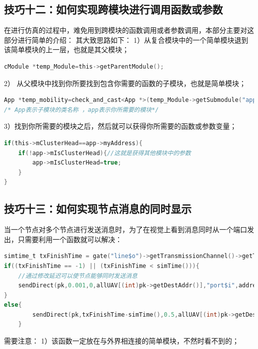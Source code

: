 \subsection{技巧十二：如何实现跨模块进行调用函数或参数}
\label{技巧十二：如何实现跨模块进行调用函数或参数}

在进行仿真的过程中，难免用到跨模块的函数调用或者参数调用，本部分主要对这部分进行简单的介绍：
其大致思路如下：
1）从复合模块中的一个简单模块退到该简单模块的上一层，也就是其父模块；

\begin{lstlisting}[language=c]
cModule *temp_Module=this->getParentModule();
\end{lstlisting}

2） 从父模块中找到你所要找到包含你需要的函数的子模块，也就是简单模块；

\begin{lstlisting}[language=c]
App *temp_mobility=check_and_cast<App *>(temp_Module->getSubmodule("app"));
/* App表示子模块的类名称 ，app表示你所需要的模块*/
\end{lstlisting}

3）找到你所需要的模块之后，然后就可以获得你所需要的函数或参数变量；

\begin{lstlisting}[language=c]
if(this->mClusterHead==app->myAddress){
    if(!app->mIsClusterHead){//这就是获得其他模块中的参数
        app->mIsClusterHead=true;
    }
}
\end{lstlisting}

\subsection{技巧十三：如何实现节点消息的同时显示}
\label{技巧十三：如何实现节点消息的同时显示}

当一个节点对多个节点进行发送消息时，为了在视觉上看到消息同时从一个端口发出，只需要利用一个函数就可以解决：

\begin{lstlisting}[language=c]
simtime_t txFinishTime = gate("line$o")->getTransmissionChannel()->getTransmissionFinishTime();
if((txFinishTime == -1) || (txFinishTime < simTime())){
    //通过修改延迟可以使节点能够同时发送消息
    sendDirect(pk,0.001,0,allUAV[(int)pk->getDestAddr()],"port$i",address);
}
else{
        sendDirect(pk,txFinishTime-simTime(),0.5,allUAV[(int)pk->getDestAddr()],"port$i",address);
    }
\end{lstlisting}

需要注意：
1）该函数一定放在与外界相连接的简单模块，不然时看不到的；

